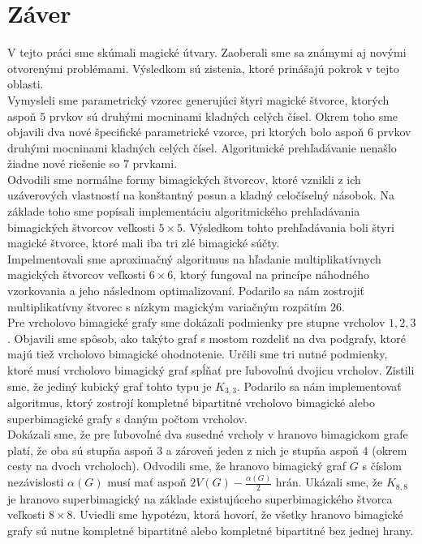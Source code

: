 \chapter*{Záver}  %

V tejto práci sme skúmali magické útvary. Zaoberali sme sa známymi aj novými otvorenými problémami. Výsledkom sú zistenia, ktoré prinášajú pokrok v tejto oblasti. \\

Vymysleli sme parametrický vzorec generujúci štyri magické štvorce, ktorých aspoň $5$ prvkov sú druhými mocninami kladných celých čísel. Okrem toho sme objavili dva nové špecifické parametrické vzorce, pri ktorých bolo aspoň $6$ prvkov druhými mocninami kladných celých čísel. Algoritmické prehľadávanie nenašlo žiadne nové riešenie so $7$ prvkami. \\

Odvodili sme normálne formy bimagických štvorcov, ktoré vznikli z ich uzáverových vlastností na konštantný posun a kladný celočíselný násobok. Na základe toho sme popísali implementáciu algoritmického prehľadávania bimagických štvorcov veľkosti $5 \times 5$. Výsledkom tohto prehľadávania boli štyri magické štvorce, ktoré mali iba tri zlé bimagické súčty. \\

Impelmentovali sme aproximačný algoritmus na hľadanie multiplikatívnych magických štvorcov veľkosti $6 \times 6$, ktorý fungoval na princípe náhodného vzorkovania a jeho následnom optimalizovaní. Podarilo sa nám zostrojiť multiplikatívny štvorec s nízkym magickým variačným rozpätím $26$. \\

Pre vrcholovo bimagické grafy sme dokázali podmienky pre stupne vrcholov $1, 2, 3$. Objavili sme spôsob, ako takýto graf s mostom rozdeliť na dva podgrafy, ktoré majú tiež vrcholovo bimagické ohodnotenie. Určili sme tri nutné podmienky, ktoré musí vrcholovo bimagický graf spĺňať pre ľubovoľnú dvojicu vrcholov. Zistili sme, že jediný kubický graf tohto typu je $K_{3,3}$. Podarilo sa nám implementovať algoritmus, ktorý zostrojí kompletné bipartitné vrcholovo bimagické alebo superbimagické grafy s daným počtom vrcholov. \\

Dokázali sme, že pre ľubovoľné dva susedné vrcholy v hranovo bimagickom grafe platí, že oba sú stupňa aspoň $3$ a zároveň jeden z nich je stupňa aspoň $4$ (okrem cesty na dvoch vrcholoch). Odvodili sme, že hranovo bimagický graf $G$ s číslom nezávislosti $\alpha (G)$ musí mať aspoň $2 V(G) - \frac{\alpha (G)}{2}$ hrán. Ukázali sme, že $K_{8,8}$ je hranovo superbimagický na základe existujúceho superbimagického štvorca veľkosti $8 \times 8$. Uviedli sme hypotézu, ktorá hovorí, že všetky hranovo bimagické grafy sú nutne kompletné bipartitné alebo kompletné bipartitné bez jednej hrany. \\

